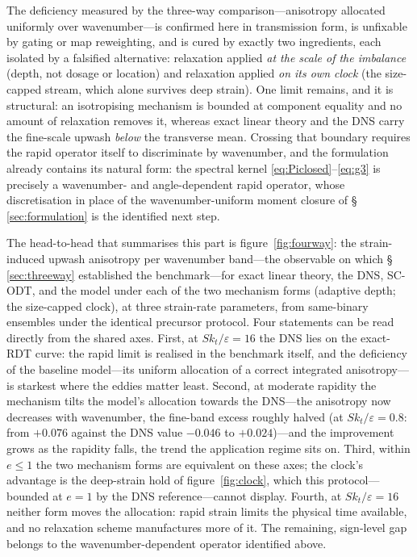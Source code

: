 \documentclass[lineno]{JFM-FLM_Au}
\begin{document}
The deficiency measured by the three-way comparison---anisotropy allocated uniformly over wavenumber---is confirmed here in transmission form, is unfixable by
gating or map reweighting, and is cured by exactly two ingredients,
each isolated by a falsified alternative: relaxation applied \emph{at
the scale of the imbalance} (depth, not dosage or location) and
relaxation applied \emph{on its own clock} (the size-capped stream,
which alone survives deep strain). One limit remains, and it is structural: an isotropising mechanism is bounded at component equality and no amount of relaxation removes it, whereas exact
linear theory and the DNS carry the fine-scale upwash \emph{below} the
transverse mean. Crossing that boundary requires the rapid operator
itself to discriminate by wavenumber, and the formulation already
contains its natural form: the spectral kernel
\eqref{eq:Piclosed}--\eqref{eq:g3} is precisely a wavenumber- and
angle-dependent rapid operator, whose discretisation in place of the
wavenumber-uniform moment closure of \S\,\ref{sec:formulation} is the
identified next step.

The head-to-head that summarises this part is
figure~\ref{fig:fourway}: the strain-induced upwash anisotropy per
wavenumber band---the observable on which \S\,\ref{sec:threeway}
established the benchmark---for exact linear theory, the DNS, SC-ODT,
and the model under each of the two mechanism
forms (adaptive depth; the size-capped clock), at three strain-rate
parameters, from same-binary ensembles under the identical precursor
protocol. Four statements can be read directly from the shared axes.
First, at $Sk_t/\varepsilon=16$ the DNS lies on the exact-RDT curve:
the rapid limit is realised in the benchmark itself, and the
deficiency of the baseline model---its uniform allocation of a correct
integrated anisotropy---is starkest where the eddies matter least. Second, at moderate rapidity the mechanism tilts the model's
allocation towards the DNS---the anisotropy now decreases with
wavenumber, the fine-band excess roughly halved (at
$Sk_t/\varepsilon=0.8$: from $+0.076$ against the DNS value $-0.046$
to $+0.024$)---and the improvement grows as the rapidity falls, the
trend the application regime sits on. Third, within $e\le1$ the two
mechanism forms are equivalent on these axes; the clock's advantage is
the deep-strain hold of figure~\ref{fig:clock}, which this
protocol---bounded at $e=1$ by the DNS reference---cannot display.
Fourth, at $Sk_t/\varepsilon=16$ neither form moves the allocation:
rapid strain limits the physical time available, and no relaxation
scheme manufactures more of it. The remaining, sign-level gap belongs
to the wavenumber-dependent operator identified above.
\end{document}
